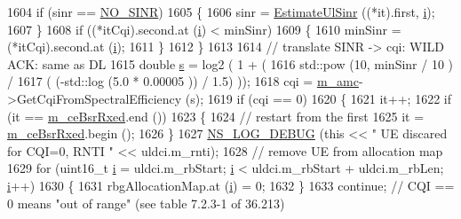 \begin{DoxyCode}
1604               \textcolor{keywordflow}{if} (sinr == \hyperlink{cqa-ff-mac-scheduler_8h_a520d71777be043568160c783a9c65fd5}{NO\_SINR})
1605                 \{
1606                   sinr = \hyperlink{classns3_1_1TdBetFfMacScheduler_a051dacc13beec936c3e5206d865837bc}{EstimateUlSinr} ((*it).first, \hyperlink{bernuolliDistribution_8m_a6f6ccfcf58b31cb6412107d9d5281426}{i});
1607                 \}
1608               \textcolor{keywordflow}{if} ((*itCqi).second.at (\hyperlink{bernuolliDistribution_8m_a6f6ccfcf58b31cb6412107d9d5281426}{i}) < minSinr)
1609                 \{
1610                   minSinr = (*itCqi).second.at (\hyperlink{bernuolliDistribution_8m_a6f6ccfcf58b31cb6412107d9d5281426}{i});
1611                 \}
1612             \}
1613 
1614           \textcolor{comment}{// translate SINR -> cqi: WILD ACK: same as DL}
1615           \textcolor{keywordtype}{double} \hyperlink{generate__test__data__lte__sinr_8m_ad83eeb3a142285d1243a08c6b7026df8}{s} = log2 ( 1 + (
1616                                  std::pow (10, minSinr / 10 )  /
1617                                  ( (-std::log (5.0 * 0.00005 )) / 1.5) ));
1618           cqi = \hyperlink{classns3_1_1TdBetFfMacScheduler_a3ba724ed3776a6cb493df6dd91b810d6}{m\_amc}->GetCqiFromSpectralEfficiency (s);
1619           \textcolor{keywordflow}{if} (cqi == 0)
1620             \{
1621               it++;
1622               \textcolor{keywordflow}{if} (it == \hyperlink{classns3_1_1TdBetFfMacScheduler_ab10364d54dad2ec2afed0c168cdad4d3}{m\_ceBsrRxed}.end ())
1623                 \{
1624                   \textcolor{comment}{// restart from the first}
1625                   it = \hyperlink{classns3_1_1TdBetFfMacScheduler_ab10364d54dad2ec2afed0c168cdad4d3}{m\_ceBsrRxed}.begin ();
1626                 \}
1627               \hyperlink{group__logging_ga413f1886406d49f59a6a0a89b77b4d0a}{NS\_LOG\_DEBUG} (\textcolor{keyword}{this} << \textcolor{stringliteral}{" UE discared for CQI=0, RNTI "} << uldci.m\_rnti);
1628               \textcolor{comment}{// remove UE from allocation map}
1629               \textcolor{keywordflow}{for} (uint16\_t \hyperlink{bernuolliDistribution_8m_a6f6ccfcf58b31cb6412107d9d5281426}{i} = uldci.m\_rbStart; \hyperlink{bernuolliDistribution_8m_a6f6ccfcf58b31cb6412107d9d5281426}{i} < uldci.m\_rbStart + uldci.m\_rbLen; 
      \hyperlink{bernuolliDistribution_8m_a6f6ccfcf58b31cb6412107d9d5281426}{i}++)
1630                 \{
1631                   rbgAllocationMap.at (\hyperlink{bernuolliDistribution_8m_a6f6ccfcf58b31cb6412107d9d5281426}{i}) = 0;
1632                 \}
1633               \textcolor{keywordflow}{continue}; \textcolor{comment}{// CQI == 0 means "out of range" (see table 7.2.3-1 of 36.213)}

\end{DoxyCode}
